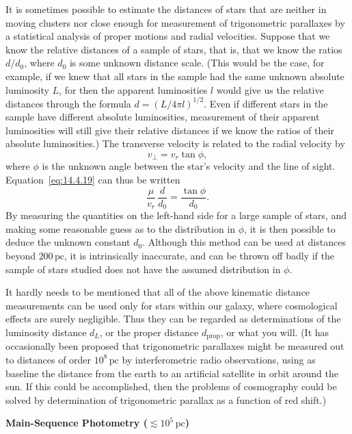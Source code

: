 It is sometimes possible to estimate the distances of stars that are neither
in moving clusters nor close enough for measurement of trigonometric
parallaxes by a statistical analysis of proper motions and radial
velocities. Suppose that we know the relative distances of a sample of
stars, that is, that we know the ratios \(d/d_0\), where \(d_0\) is some
unknown distance scale. (This would be the case, for example, if we knew
that all stars in the sample had the same unknown absolute luminosity \(L\),
for then the apparent luminosities \(l\) would give us the relative
distances through the formula \(d=(L/4\pi l)^{1/2}\). Even if different
stars in the sample have different absolute luminosities, measurement of
their apparent luminosities will still give their relative distances if we
know the ratios of their absolute luminosities.) The transverse velocity is
related to the radial velocity by
\[
  v_\perp=v_r\tan\phi,
\]
where \(\phi\) is the unknown angle between the star's velocity and the line
of sight. Equation~\eqref{eq:14.4.19} can thus be written
\[
  \frac{\mu}{v_r}\,\frac{d}{d_0}
  =
  \frac{\tan\phi}{d_0}.
\]
By measuring the quantities on the left-hand side for a large sample of
stars, and making some reasonable guess as to the distribution in \(\phi\),
it is then possible to deduce the unknown constant \(d_0\). Although this
method can be used at distances beyond \(200\,\mathrm{pc}\), it is
intrinsically inaccurate, and can be thrown off badly if the sample of stars
studied does not have the assumed distribution in \(\phi\).

It hardly needs to be mentioned that all of the above kinematic distance
measurements can be used only for stars within our galaxy, where
cosmological effects are surely negligible. Thus they can be regarded as
determinations of the luminosity distance \(d_L\), or the proper distance
\(d_{\mathrm{prop}}\), or what you will. (It has occasionally been proposed
that trigonometric parallaxes might be measured out to distances of order
\(10^8\,\mathrm{pc}\) by interferometric radio observations, using as
baseline the distance from the earth to an artificial satellite in orbit
around the sun. If this could be accomplished, then the problems of
cosmography could be solved by determination of trigonometric parallax as a
function of red shift.)

\medskip
\noindent\textbf{Main-Sequence Photometry (\(\lesssim10^5\,\mathrm{pc}\))}
\par\smallskip

